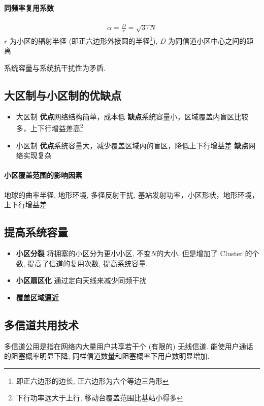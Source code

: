 \documentclass[a4paper]{report}
\begin{document}
 \paragraph{同频率复用系数}
\begin{align*}
	\alpha = \frac{D}{r} = \sqrt{3\cdot N}
\end{align*}
$r$ 为小区的辐射半径 (即正六边形外接圆的半径\footnote{即正六边形的边长, 正六边形为六个等边三角形}), $D$ 为同信道小区中心之间的距离

系统容量与系统抗干扰性为矛盾. 

\subsection{大区制与小区制的优缺点}
\begin{itemize}
	\item 大区制
	\subitem \textbf{优点}网络结构简单，成本低
	\subitem \textbf{缺点}系统容量小，区域覆盖内盲区比较多，上下行增益差高\footnote{下行功率远大于上行, 移动台覆盖范围比基站小得多}
	\item 小区制
	\subitem \textbf{优点}系统容量大，减少覆盖区域内的盲区，降低上下行增益差
	\subitem \textbf{缺点}网络实现复杂
\end{itemize}

\paragraph{小区覆盖范围的影响因素}地球的曲率半径, 地形环境, 多径反射干扰, 基站发射功率，小区形状，地形环境，上下行增益差

\subsection{提高系统容量}
\begin{itemize}
	\item \textbf{小区分裂} 将拥塞的小区分为更小小区, 不变$N$的大小, 但是增加了 Cluster 的个数, 提高了信道的复用次数, 提高系统容量. 
	\item \textbf{小区扇区化} 通过定向天线来减少同频干扰
	\item \textbf{覆盖区域逼近}
\end{itemize}
\subsection{多信道共用技术}
多信道公用是指在网络内大量用户共享若干个 (有限的) 无线信道. 能使用户通话的阻塞概率明显下降, 同样信道数量和阻塞概率下用户数明显增加.
\end{document}
